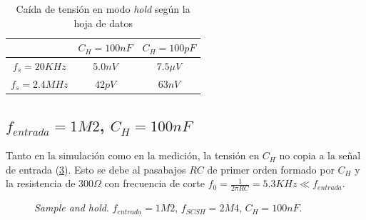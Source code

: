 \documentclass[../../ASSD_TP1_G7.tex]{subfiles}
\begin{document}
\begin{table}[H]
	\centering
	\begin{tabular}{|c|c|c|}
	\hline 
	 & $C_H = 100nF$ & $C_H = 100pF$ \\ 
	\hline 
	$f_s = 20KHz$ & $5.0nV $ & $7.5\mu V$ \\ 
	\hline 
	$f_s=2.4MHz$ & $42pV$ & $63nV$ \\ 
	\hline 
	\end{tabular}
	\caption{Ca\'ida de tensi\'on en modo \textit{hold} seg\'un la hoja de datos}
	\label{tab:syh_droop_rate}
\end{table}


\subsection{$f_{entrada}=1M2$, $C_H = 100nF$ } 
\label{ssec:syh_1m2_2m4_100n}
Tanto en la simulaci\'on como en la medici\'on, la tensi\'on en $C_H$ no copia a la se\~nal de entrada (\ref{fig:syh_1m2_2m4_100n}). Esto se debe al pasabajos $RC$ de primer orden formado por $C_H$ y la resistencia de $300\Omega$ con frecuencia de corte $f_0 = \frac{1}{2\pi RC} = 5.3KHz \ll f_{entrada}$. 

\begin{figure}[H]
	\centering
	\begin{subfigure}[t]{0.45\linewidth}
		
		\label{fig:syh_1m2_2m4_100n_med}
	\end{subfigure}
	\begin{subfigure}[t]{0.45\linewidth}
		
		\label{fig:syh_1m2_2m4_100n_sim}
	\end{subfigure}
	\caption{\textit{Sample and hold}. $f_{entrada} = 1M2$, $f_{SCSH}=2M4$, $C_H = 100nF$.}
	\label{fig:syh_1m2_2m4_100n}
\end{figure}


\end{document}

